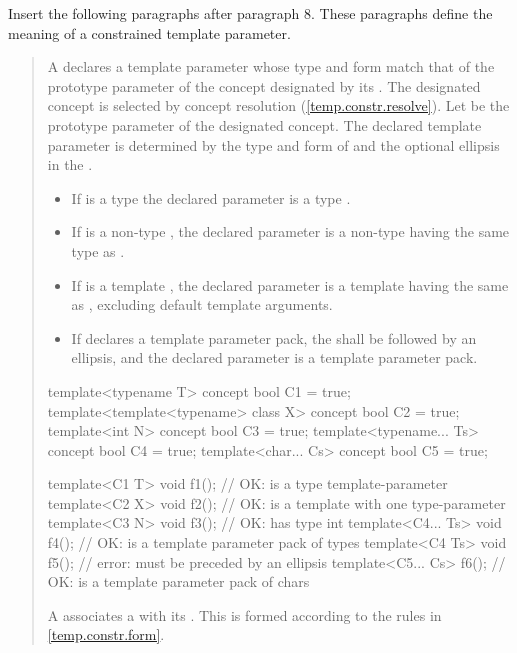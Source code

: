 Insert the following paragraphs after paragraph 8. These paragraphs
define the meaning of a constrained template parameter.

\begin{quote}
\setcounter{Paras}{8}
\pnum
A  declares a template parameter whose 
type and form match that of the prototype parameter of the concept designated 
by its .
% 
The designated concept is selected by concept resolution 
(\ref{temp.constr.resolve}).
% 
Let  be the prototype parameter of the designated
concept. The declared template parameter is determined by the type
and form of  and the optional ellipsis in the
.
% 
\begin{itemize}
\item If  is a type  the declared
parameter is a type . 

\item If  is a non-type , the declared
parameter is a non-type  having the same 
type as .

\item If  is a template , the declared
parameter is a template  having the same 
 as , excluding default template 
arguments.

\item If  declares a template parameter pack, the 
 shall be followed by an ellipsis,
and the declared parameter is a template parameter pack. 
\end{itemize}
% 
\enterexample
\begin{codeblock}
template<typename T> concept bool C1 = true;
template<template<typename> class X> concept bool C2 = true;
template<int N> concept bool C3 = true;
template<typename... Ts> concept bool C4 = true;
template<char... Cs> concept bool C5 = true;

template<C1 T> void f1();     // OK:  is a type template-parameter
template<C2 X> void f2();     // OK:  is a template with one type-parameter
template<C3 N> void f3();     // OK:  has type int
template<C4... Ts> void f4(); // OK:  is a template parameter pack of types
template<C4 Ts> void f5();    // error:  must be preceded by an ellipsis
template<C5... Cs> f6();      // OK:  is a template parameter pack of chars
\end{codeblock}
\exitexample

\pnum
A  associates a
 with its
. 
% 
This  is formed according to the rules 
in \ref{temp.constr.form}.
\end{quote}

